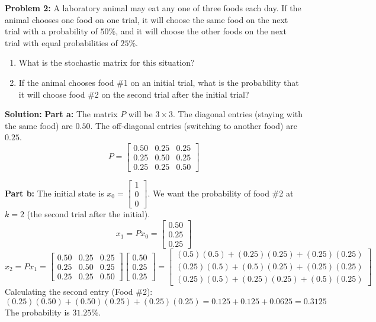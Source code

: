 \documentclass[11pt, letterpaper]{article}
\theoremstyle{definition}
\theoremstyle{remark}
\begin{document}
\vspace{1em}
\textbf{Problem 2:} A laboratory animal may eat any one of three foods each day. If the animal chooses one food on one trial, it will choose the same food on the next trial with a probability of $50\%$, and it will choose the other foods on the next trial with equal probabilities of $25\%$.
\begin{enumerate}[label=\alph*.]
    \item What is the stochastic matrix for this situation?
    \item If the animal chooses food \#1 on an initial trial, what is the probability that it will choose food \#2 on the second trial after the initial trial?
\end{enumerate}

\textbf{Solution:}
\textbf{Part a:} The matrix $P$ will be $3 \times 3$. The diagonal entries (staying with the same food) are $0.50$. The off-diagonal entries (switching to another food) are $0.25$.
\[ P = \begin{bmatrix} 0.50 & 0.25 & 0.25 \\ 0.25 & 0.50 & 0.25 \\ 0.25 & 0.25 & 0.50 \end{bmatrix} \]

\textbf{Part b:} The initial state is $x_0 = \begin{bmatrix} 1 \\ 0 \\ 0 \end{bmatrix}$. We want the probability of food \#2 at $k=2$ (the second trial after the initial).
\[ x_1 = P x_0 = \begin{bmatrix} 0.50 \\ 0.25 \\ 0.25 \end{bmatrix} \]
\[ x_2 = P x_1 = \begin{bmatrix} 0.50 & 0.25 & 0.25 \\ 0.25 & 0.50 & 0.25 \\ 0.25 & 0.25 & 0.50 \end{bmatrix} \begin{bmatrix} 0.50 \\ 0.25 \\ 0.25 \end{bmatrix} = \begin{bmatrix} (0.5)(0.5) + (0.25)(0.25) + (0.25)(0.25) \\ (0.25)(0.5) + (0.5)(0.25) + (0.25)(0.25) \\ (0.25)(0.5) + (0.25)(0.25) + (0.5)(0.25) \end{bmatrix} \]
Calculating the second entry (Food \#2):
\[ (0.25)(0.50) + (0.50)(0.25) + (0.25)(0.25) = 0.125 + 0.125 + 0.0625 = 0.3125 \]
The probability is \textbf{$31.25\%$}.
\end{document}
